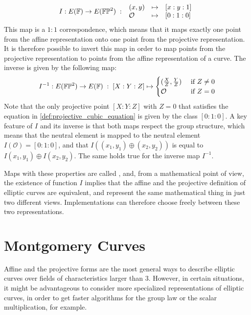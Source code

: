 \begin{equation}\label{eq:weierstrass-isomorphism-map}
I : E(\mathbb{F}) \to E(\mathbb{F}\mathbb{P}^2)\;:\;
\begin{array}{lcl}
(x,y)       &\mapsto & [x:y:1]\\
\mathcal{O} &\mapsto & [0:1:0]
\end{array}
\end{equation}
This map is a $1:1$ correspondence, which means that it maps exactly one point from the affine representation onto one point from the projective representation. It is therefore possible to invert this map in order to map points from the projective representation to points from the affine representation of a  curve. The inverse is given by the following map:
\begin{equation}
I^{-1} : E(\mathbb{F}\mathbb{P}^2)\to E(\mathbb{F}) \;:\; [X:Y:Z] \mapsto \begin{cases}
(\frac{X}{Z},\frac{Y}{Z}) & \text{ if } Z\neq 0\\
\mathcal{O} & \text{ if } Z=0
\end{cases}
\end{equation}
Note that the only projective point $[X:Y:Z]$ with $Z = 0$ that satisfies the equation in \ref{def:projective_cubic_equation} is given by the class $[0:1:0]$. A key feature of $I$ and its inverse is that both maps respect the group structure, which means that the neutral element is mapped to the neutral element $I(\mathcal{O})=[0:1:0]$, and that  $I((x_1,y_1)\oplus (x_2,y_2))$ is equal to $I(x_1,y_1)\oplus I(x_2,y_2)$. The same holds true for the inverse map $I^{-1}$.

Maps with these properties are called , and, from a mathematical point of view, the existence of function $I$ implies that the affine and the projective definition of  elliptic curves are equivalent, and represent the same mathematical thing in just two different views. Implementations can therefore choose freely between these two representations. 


\section{Montgomery Curves}\label{sec:montgomery}
Affine and the projective  forms are the most general ways to describe elliptic curves over fields of characteristics larger than $3$. However, in certain situations, it might be advantageous to consider more specialized representations of elliptic curves, in order to get faster algorithms for the group law or the scalar multiplication, for example. 

